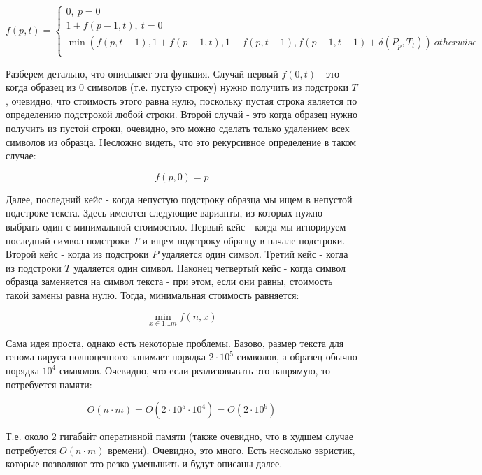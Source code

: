 \documentclass[11pt,a4paper,oneside]{article}
\begin{document}
\begin{equation}
\label{eq:cost}
	f(p,t) = \begin{cases}
	0,\ p = 0\\
	1+f(p-1,t),\ t = 0\\
	\min(f(p,t-1), 1+f(p-1,t), 1+f(p,t-1), f(p-1,t-1)+\delta(P_p,T_t) )\ otherwise\\
	\end{cases} 
\end{equation}

Разберем детально, что описывает эта функция. Случай первый $f(0,t)$ - это когда образец из 0 символов (т.е. пустую строку) нужно получить из подстроки $T$, очевидно, что стоимость этого равна нулю, поскольку пустая строка является по определению подстрокой любой строки. Второй случай - это когда образец нужно получить из пустой строки, очевидно, это можно сделать только удалением всех символов из образца. Несложно видеть, что это рекурсивное определение в таком случае:

\begin{equation}
	f(p,0) = p
\end{equation}

Далее, последний кейс - когда непустую подстроку образца мы ищем в непустой подстроке текста. Здесь имеются следующие варианты, из которых нужно выбрать один с минимальной стоимостью. Первый кейс - когда мы игнорируем последний символ подстроки $T$ и ищем подстроку образцу в начале подстроки. Второй кейс - когда из подстроки $P$ удаляется один символ. Третий кейс - когда из подстроки $T$ удаляется один символ. Наконец четвертый кейс - когда символ образца заменяется на символ текста - при этом, если они равны, стоимость такой замены равна нулю. Тогда, минимальная стоимость равняется:

\begin{equation}
	\min_{x\in 1\ldots m} f(n,x)
\end{equation}

Сама идея проста, однако есть некоторые проблемы. Базово, размер текста для генома вируса полноценного занимает порядка $2\cdot 10^5$ символов, а образец обычно порядка $10^4$ символов. Очевидно, что если реализовывать это напрямую, то потребуется памяти:

\begin{equation}
	O(n\cdot m) = O(2\cdot 10^5\cdot 10^4) = O(2\cdot 10^9)
\end{equation}

Т.е. около 2 гигабайт оперативной памяти (также очевидно, что в худшем случае потребуется $O(n\cdot m)$ времени). Очевидно, это много. Есть несколько эвристик, которые позволяют это резко уменьшить и будут описаны далее.
\end{document}
